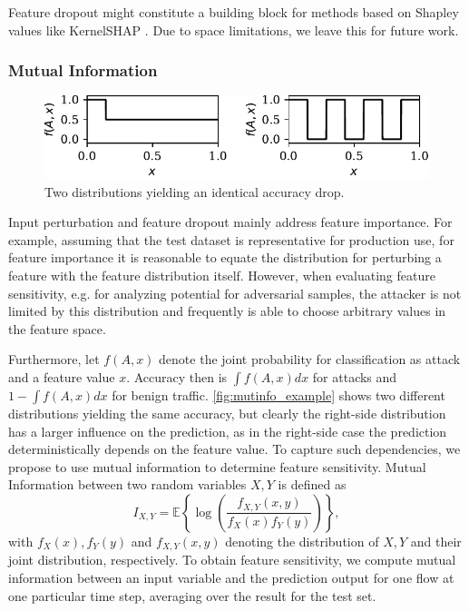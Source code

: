 \documentclass[conference]{IEEEtran}
\newcommand\note[2]{{\color{#1}#2}}
\newcommand\todo[1]{{\note{red}{TODO: #1}}}
\begin{document}
Feature dropout might constitute a building block for methods based on Shapley values \cite{shapley_value_1953} like KernelSHAP \cite{lundberg_unified_2017}. Due to space limitations, we leave this for future work.
\subsubsection{Mutual Information}
\begin{figure}
\includegraphics[width=\columnwidth]{../plots/mutinfo_example.pdf}
\caption{Two distributions yielding an identical accuracy drop.}
\label{fig:mutinfo_example}
\end{figure}
Input perturbation and feature dropout mainly address feature importance.
For example, assuming that the test dataset is representative for production use, for feature importance it is reasonable to equate the distribution for perturbing a feature with the feature distribution itself. However, when evaluating feature sensitivity, e.g. for analyzing potential for adversarial samples, the attacker is not limited by this distribution and frequently is able to choose arbitrary values in the feature space.

Furthermore, let $f(A,x)$  denote the joint probability
for classification as attack and a feature value $x$. Accuracy then is $\int f(A,x) dx$ for attacks and $1-\int f(A,x) dx$ for benign traffic.
\autoref{fig:mutinfo_example} shows two different distributions
yielding the same accuracy, but clearly the right-side distribution has a larger influence on the prediction, as in the right-side case the prediction deterministically depends on the feature value.
To capture such dependencies, we propose to use mutual information %
to determine feature sensitivity.
Mutual Information between two random variables $X,Y$ is defined as
\begin{equation}
I_{X,Y} = \mathbb E \left\{ \log\left(\frac{f_{X,Y}(x,y)}{f_X(x)f_Y(y)}\right) \right\},
\end{equation}
with $f_X(x), f_Y(y)$ and $f_{X,Y}(x,y)$ denoting the distribution of $X,Y$ and their joint distribution, respectively. To obtain feature sensitivity, we compute mutual information between an input variable and the prediction output for one flow at one particular time step, averaging over the result for the test set.
\end{document}
